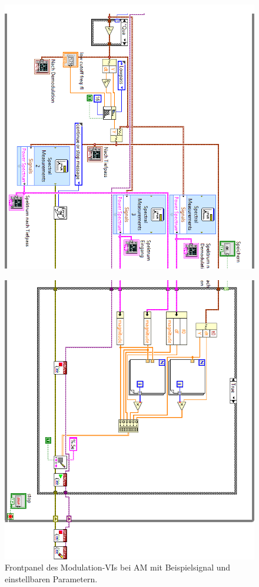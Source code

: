 			\begin{figure}[H]
			\centering
			\includegraphics[width=\textwidth]{pic/messstruktur_dam2.png}
		\end{figure} 
	
		\begin{figure}[H]
			\centering
			\includegraphics[width=\textwidth]{pic/messstruktur_dam3.png}
			\caption{Frontpanel des Modulation-VIs bei AM mit Beispielsignal und einstellbaren Parametern.}
			\label{fig:messstruktur_dam}	
		\end{figure} 
	
